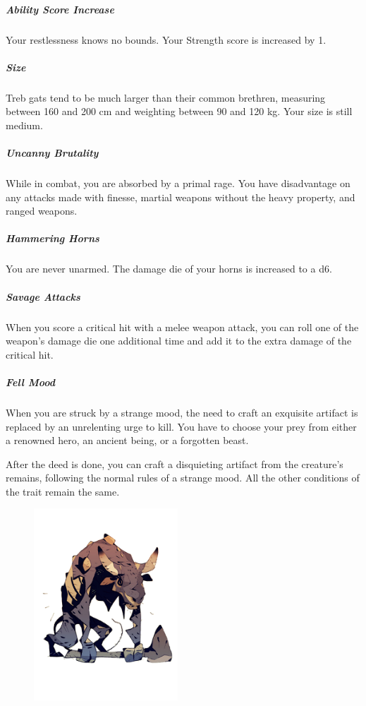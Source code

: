     \subparagraph{Ability Score Increase} Your restlessness knows no bounds.
    Your Strength score is increased by 1.

    \subparagraph{Size} Treb gats tend to be much larger than their common brethren, measuring between 160 and 200 cm and weighting between 90 and 120 kg.
    Your size is still medium.

    \subparagraph{Uncanny Brutality} While in combat, you are absorbed by a primal rage.
    You have disadvantage on any attacks made with finesse, martial weapons without the heavy property, and ranged weapons.

    \subparagraph{Hammering Horns} You are never unarmed.
    The damage die of your horns is increased to a d6.

    \subparagraph{Savage Attacks} When you score a critical hit with a melee weapon attack, you can roll one of the weapon's damage die one additional time and add it to the extra damage of the critical hit.

    \subparagraph{Fell Mood} When you are struck by a strange mood, the need to craft an exquisite artifact is replaced by an unrelenting urge to kill.
    You have to choose your prey from either a renowned hero, an ancient being, or a forgotten beast.

    After the deed is done, you can craft a disquieting artifact from the creature's remains, following the normal rules of a strange mood.
    All the other conditions of the trait remain the same.%

\begin{figure}[!b]
    \centering
    \includegraphics[width=0.48\textwidth]{04kins/img/11gat_treb.png}
\end{figure}

\newpage
